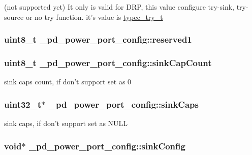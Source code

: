 (not supported yet) It only is valid for D\-R\-P, this value configure try-\/sink, try-\/source or no try function. it's value is \hyperlink{group__usb__pd__stack_ga86c3c8c95607b75c0c75cd2714487497}{typec\-\_\-try\-\_\-t} \hypertarget{struct__pd__power__port__config_ae6a55ddacda35e342d72b9ee6f7fadba}{
\subsubsection[{reserved1}]{\setlength{\rightskip}{0pt plus 5cm}uint8\-\_\-t \-\_\-pd\-\_\-power\-\_\-port\-\_\-config\-::reserved1}}\label{struct__pd__power__port__config_ae6a55ddacda35e342d72b9ee6f7fadba}
\hypertarget{struct__pd__power__port__config_aa1d58bf75fbebad4b8c7e29b0cc4c64e}{
\subsubsection[{sink\-Cap\-Count}]{\setlength{\rightskip}{0pt plus 5cm}uint8\-\_\-t \-\_\-pd\-\_\-power\-\_\-port\-\_\-config\-::sink\-Cap\-Count}}\label{struct__pd__power__port__config_aa1d58bf75fbebad4b8c7e29b0cc4c64e}
sink caps count, if don't support set as 0 \hypertarget{struct__pd__power__port__config_ab247068e26ad76b2670eb96da39969e1}{
\subsubsection[{sink\-Caps}]{\setlength{\rightskip}{0pt plus 5cm}uint32\-\_\-t$\ast$ \-\_\-pd\-\_\-power\-\_\-port\-\_\-config\-::sink\-Caps}}\label{struct__pd__power__port__config_ab247068e26ad76b2670eb96da39969e1}
sink caps, if don't support set as N\-U\-L\-L \hypertarget{struct__pd__power__port__config_ab0b7a0e266e429764b5af0dd6a57a303}{
\subsubsection[{sink\-Config}]{\setlength{\rightskip}{0pt plus 5cm}void$\ast$ \-\_\-pd\-\_\-power\-\_\-port\-\_\-config\-::sink\-Config}}\label{struct__pd__power__port__config_ab0b7a0e266e429764b5af0dd6a57a303}
